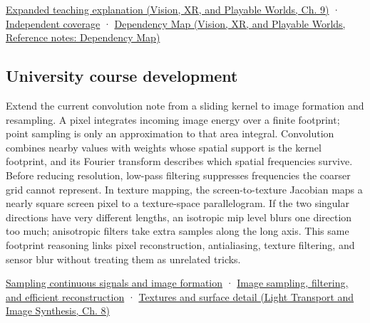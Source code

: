 \href{../07-Vision-XR-and-Playable-Worlds/main.pdf\#nameddest=04-visual-computing-ii-ch042-a-footprint-is-more-meaningful-than-an-isolated-pixel-center}{Expanded teaching explanation (Vision, XR, and Playable Worlds, Ch. 9)} · \hyperref[appendix-fd090d982a15-xr01---independent-seeing-and-representation-source]{Independent coverage} · \href{../07-Vision-XR-and-Playable-Worlds/main.pdf\#nameddest=appendix-4ad47bdd269a}{Dependency Map (Vision, XR, and Playable Worlds, Reference notes: Dependency Map)}

\subsection{University course development}\label{appendix-d5b3c692d9f0-university-course-development}

Extend the current convolution note from a sliding kernel to image formation and resampling. A pixel integrates incoming image energy over a finite footprint; point sampling is only an approximation to that area integral. Convolution combines nearby values with weights whose spatial support is the kernel footprint, and its Fourier transform describes which spatial frequencies survive. Before reducing resolution, low-pass filtering suppresses frequencies the coarser grid cannot represent. In texture mapping, the screen-to-texture Jacobian maps a nearly square screen pixel to a texture-space parallelogram. If the two singular directions have very different lengths, an isotropic mip level blurs one direction too much; anisotropic filters take extra samples along the long axis. This same footprint reasoning links pixel reconstruction, antialiasing, texture filtering, and sensor blur without treating them as unrelated tricks.

\hyperref[03-visual-computing-i-ch003-sampling-continuous-signals-and-image-formation]{Sampling continuous signals and image formation} · \hyperref[03-visual-computing-i-ch004-image-sampling-filtering-and-efficient-reconstruction]{Image sampling, filtering, and efficient reconstruction} · \href{../04-Light-Transport-and-Image-Synthesis/main.pdf\#nameddest=03-visual-computing-i-ch019-textures-and-surface-detail}{Textures and surface detail (Light Transport and Image Synthesis, Ch. 8)}
